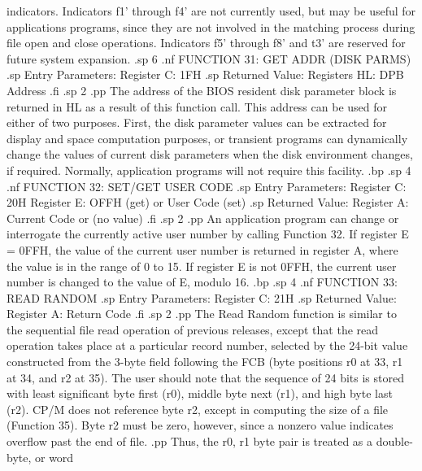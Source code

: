 indicators.  Indicators f1' through f4' are not currently used, 
but may be useful for applications programs, since they are not 
involved in the matching process during file open and close 
operations.  Indicators f5' through f8' and t3' are reserved for 
future system expansion.
.sp 6
.nf
               FUNCTION 31:  GET ADDR (DISK PARMS)
.sp
                Entry Parameters:
                      Register C:  1FH
.sp
                Returned Value:
                    Registers HL:  DPB Address
.fi
.sp 2
.pp
The address of the BIOS resident disk parameter block is returned 
in HL as a result of this function call.  This address can be 
used for either of two purposes.  First, the disk parameter 
values can be extracted for display and space computation 
purposes, or transient programs can dynamically change the values 
of current disk parameters when the disk environment changes, if 
required.  Normally, application programs will not require this 
facility.
.bp
.sp 4
.nf
                 FUNCTION 32:  SET/GET USER CODE
.sp
               Entry Parameters:
                     Register C:  20H
                     Register E:  OFFH (get) or
                                  User Code (set)
.sp
               Returned Value:
                    Register  A:  Current Code or
                                  (no value)
.fi
.sp 2
.pp
An application program can change or interrogate the currently 
active user number by calling Function 32.  If register E = 0FFH, 
the value of the current user number is returned in register A, 
where the value is in the range of 0 to 15.  If register E is not 
0FFH, the current user number is changed to the value of E, 
modulo 16.
.bp
.sp 4
.nf
                    FUNCTION 33:  READ RANDOM
.sp
                 Entry Parameters:
                       Register C:  21H
.sp
                 Returned Value:
                      Register  A:  Return Code
.fi
.sp 2
.pp
The Read Random function is similar to the sequential file read 
operation of previous releases, except that the read operation 
takes place at a particular record number, selected by the 24-bit 
value constructed from the 3-byte field following the FCB (byte 
positions r0 at 33, r1 at 34, and r2 at 35).  The user should 
note that the sequence of 24 bits is stored with least 
significant byte first (r0), middle byte next (r1), and high byte 
last (r2).  CP/M does not reference byte r2, except in computing 
the size of a file (Function 35).  Byte r2 must be zero, however, 
since a nonzero value indicates overflow past the end of file.
.pp
Thus, the r0, r1 byte pair is treated as a double-byte, or word 
